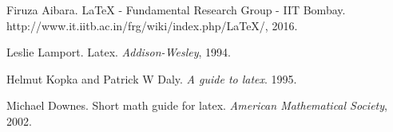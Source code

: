 \documentclass[a4paper, 11pt]{article}
\begin{document}
\begin{thebibliography}{9}
Firuza Aibara. LaTeX - Fundamental Research Group - IIT Bombay.
http://www.it.iitb.ac.in/frg/wiki/index.php/LaTeX/, 2016.

Leslie Lamport. Latex. \textsl{Addison-Wesley}, 1994.

Helmut Kopka and Patrick W Daly. \textsl{A guide to latex}. 1995.

Michael Downes. Short math guide for latex. \textsl{American Mathematical Society}, 2002.

\end{thebibliography}
 
\end{document}

